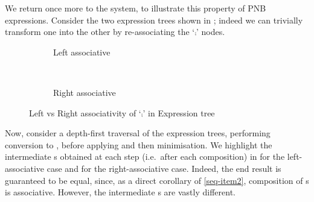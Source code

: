 We return once more to the  system, to illustrate this property of
PNB expressions. Consider the two expression trees shown in
; indeed we can trivially transform one into
the other by re-associating the `$\comp$' nodes.

\begin{figure}[ht]
    \centering
    \begin{subfigure}{\textwidth}%
        \centering
        \scalebox{0.75}{%
        \makeThreeCompTree{\usescalebox[0.75]\lendOneBox}
                          {\usescalebox[0.75]\bufferBox}
                          {\usescalebox[0.75]\rendOneBox}
        }
        \caption{Left associative}
        \label{fig:leftassocBuffers}
    \end{subfigure}\\
    \begin{subfigure}{\textwidth}%
        \centering
        \scalebox{0.75}{%
        \makeThreeCompTreeRAssoc{\usescalebox[0.75]\lendOneBox}
                                {\usescalebox[0.75]\bufferBox}
                                {\usescalebox[0.75]\rendOneBox}
        }
        \caption{Right associative}
        \label{fig:rightassocBuffers}
    \end{subfigure}%
\caption{Left vs Right associativity of `$\comp$' in  Expression tree}
\label{fig:BufferExprTreeAssocs}
\end{figure}

Now, consider a depth-first traversal of the expression trees, performing
conversion to \TNFA{}, before applying \tauClosure{} and then minimisation. We
highlight the intermediate \TNFA{}s obtained at each step (i.e.\ after each
composition) in  for the
left-associative case and  for the
right-associative case. Indeed, the end result is guaranteed to be equal,
since, as a direct corollary of \ref{seq-item2},
composition of \TNFA{}s is associative. However, the intermediate \TNFA{}s are
vastly different.

\newcommand{\rLoopOverlay}[4]{\nfaArr[loop right][overlay]{#1}{#2}{#3}{#4}}

